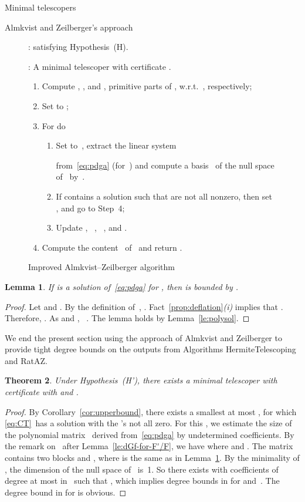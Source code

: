 \documentclass{sig-alt-full}
\newtheorem{lemma}{Lemma}
\newtheorem{theorem}[lemma]{Theorem}
\begin{document}
\begin{section}{Minimal telescopers}
\begin{subsection}{Almkvist and Zeilberger's approach}
\begin{figure}
{\begin{minipage}{8.1cm}
{\smallskip

\noindent {}:
 satisfying Hypothesis~(H).

\noindent {}:
A minimal telescoper  with certificate .
\begin{enumerate}
\item Compute , ,
and ,  primitive parts of ,  w.r.t.~,
respectively;
\item Set  to ;
\item For  do
\vspace{-0.2cm}
\begin{enumerate}
\item Set  to~, extract the linear system

from~\eqref{eq:pdga} (for~) and
compute a basis~ of the null space of~ by~\cite{Storjohann2005}.
\item If  contains a solution  such that  are not all
nonzero, then set , and go to Step~4;
\item Update , \ , \ , and .
\end{enumerate}
\item Compute the content~ of~ and return
.
\end{enumerate}
}
\end{minipage}}
\caption{Improved Almkvist--Zeilberger algorithm}
\label{fig:RatAZ}
\vskip-10pt
\end{figure}

\begin{lemma}\label{le:degb}
If  is a solution of~\eqref{eq:pdga} for , then\/  is bounded by .
\end{lemma}
\begin{proof}
Let  and .
By the definition of~,
.
Fact~\ref{prop:deflation}\emph{(i)\/} implies that
.
Therefore, .
As  and , \ .
The lemma holds by Lemma~\ref{le:polysol}.
\end{proof}

We end the present section using the approach of Almkvist and Zeilberger
to provide tight degree bounds on the outputs from Algorithms
\textsf{HermiteTelescoping} and \textsf{RatAZ}.

\begin{theorem}\label{th:AZtelesize}
Under Hypothesis~(H'), there exists a minimal telescoper  with certificate  with
 and .
\end{theorem}

\begin{proof}
By Corollary~\ref{cor:upperbound}, there exists a
smallest  at most , for which \eqref{eq:CT}~has a
solution with the 's not all zero.
For this , we estimate the size of the polynomial
matrix~ derived from~\eqref{eq:pdga} by undetermined
coefficients.
By the remark on~ after
Lemma~\ref{le:dGf-for-F'/F}, we have  where
 and
.
The matrix~ contains two blocks
 and , where  is the
same as in Lemma~\ref{le:degb}.
By the minimality of , the dimension of the null space of~
is~1. So there exists  with coefficients of
degree at most  in~
such that , which implies degree bounds in  for  and~.
The degree bound in  for  is
obvious.
\end{proof}


\end{subsection}
\end{section}
\end{document}
